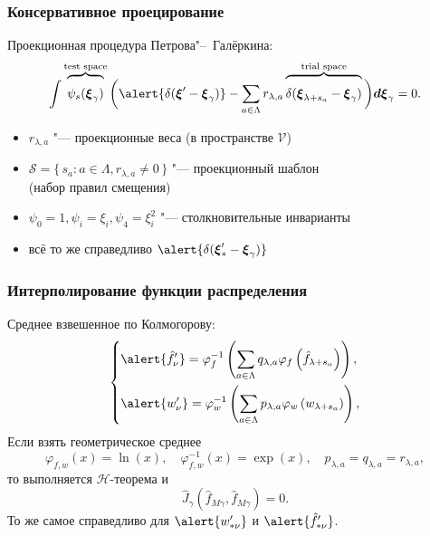 \documentclass[mathserif]{beamer} %
\newcommand{\dd}{d}%
\newcommand{\dxi}{\boldsymbol{\dd\xi}}
\newcommand{\bxi}{\boldsymbol{\xi}}
\newcommand{\Set}[2]{\{\,{#1}:{#2}\,\}}
\newcommand{\xoverbrace}[2][\vphantom{\int}]{\overbrace{#1#2}}
\renewcommand{\phi}{\varphi}
\begin{document}
\begin{frame}
    \frametitle{Консервативное проецирование}
    \vspace{10pt}

    Проекционная процедура Петрова"--~Галёркина:
    \begin{equation}\label{eq:Petrov-Galerkin}
        \int \xoverbrace{ \psi_s(\bxi_\gamma) }^\text{test space} \bigg(
            \alert{\delta(\bxi'-\bxi_\gamma)} - \sum_{a\in\Lambda} r_{\lambda,a}
            \xoverbrace{ \delta(\bxi_{\lambda+s_a}-\bxi_\gamma) }^\text{trial space}
        \bigg) \dxi_\gamma = 0.
    \end{equation}
    \begin{itemize}
        \item \(r_{\lambda,a}\) "--- проекционные веса (в пространстве \(\mathcal{V}\))
        \item \(\mathcal{S} = \Set{s_a}{a\in\Lambda, r_{\lambda,a}\neq0}\) "--- проекционный шаблон \\(набор правил смещения)
        \item \(\psi_0 = 1, \psi_i = \xi_i, \psi_4 = \xi_i^2\) "--- столкновительные инварианты
        \item всё то же справедливо \(\alert{\delta(\bxi'_*-\bxi_\gamma)}\)
    \end{itemize}
\end{frame}

\begin{frame}
    \frametitle{Интерполирование функции распределения}
    Среднее взвешенное по Колмогорову:
    \begin{equation}\label{eq:Kolmogorov_mean}
        \begin{dcases}
            \alert{\hat{f}'_{\nu}} = \phi^{-1}_f\left(\sum_{a\in\Lambda} q_{\lambda,a}
                \phi_f\left(\hat{f}_{\lambda+s_a}\right)\right), \\
            \alert{w'_{\nu}} = \phi^{-1}_w\left(\sum_{a\in\Lambda} p_{\lambda,a}
                \phi_w\left(w_{\lambda+s_a}\right)\right), \\
        \end{dcases}
    \end{equation}
    Если взять геометрическое среднее
    \begin{equation}\label{eq:geometric_mean}
       \phi_{f,w}(x) = \ln(x), \quad \phi_{f,w}^{-1}(x) = \exp(x), \quad p_{\lambda,a} = q_{\lambda,a} = r_{\lambda,a},
    \end{equation}
    то выполняется \(\mathcal{H}\)-теорема и
    \begin{equation}\label{eq:strict_interpolation}
        \hat{J}_\gamma(\hat{f}_{M\gamma}, \hat{f}_{M\gamma}) = 0.
    \end{equation}
    То же самое справедливо для \(\alert{w'_{*\nu}}\) и \(\alert{\hat{f}'_{*\nu}}\).
\end{frame}
\end{document}

